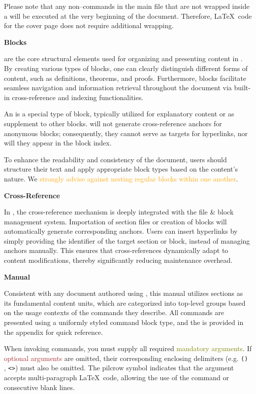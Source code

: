 Please note that any non--\!\SimpleSystemTeX commands in the main file that are not wrapped inside a  will be executed at the very beginning of the document. Therefore, \LaTeX\ code for the cover page does not require additional wrapping.

\medskip\textbf{Blocks}

 are the core structural elements used for organizing and presenting content in \SimpleSystemTeX. By creating various types of blocks, one can clearly distinguish different forms of content, such as definitions, theorems, and proofs. Furthermore, blocks facilitate seamless navigation and information retrieval throughout the document via built-in cross-reference and indexing functionalities.

An  is a special type of block, typically utilized for explanatory content or as supplement to other blocks. \SimpleSystemTeX will not generate cross-reference anchors for anonymous blocks; consequently, they cannot serve as targets for hyperlinks, nor will they appear in the block index.

To enhance the readability and consistency of the document, users should structure their text and apply appropriate block types based on the content's nature. We \textcolor{orange}{strongly advise against nesting regular blocks within one another}.

\medskip\textbf{Cross-Reference}

In \SimpleSystemTeX, the cross-reference mechanism is deeply integrated with the file \& block management system. Importation of section files or creation of blocks will automatically generate corresponding anchors. Users can insert hyperlinks by simply providing the identifier of the target section or block, instead of managing anchors manually. This ensures that cross-references dynamically adapt to content modifications, thereby significantly reducing maintenance overhead.

\medskip\SimpleSystemTeX[bf]\textbf{Manual}

Consistent with any document authored using \SimpleSystemTeX, this manual utilizes sections as its fundamental content units, which are categorized into top-level groups based on the usage contexts of the commands they describe. All commands are presented using a uniformly styled command block type, and the  is provided in the appendix for quick reference.

When invoking \SimpleSystemTeX commands, you must supply all required \textcolor{olive}{mandatory arguments}. If \textcolor{brown}{optional arguments} are omitted, their corresponding enclosing delimiters (e.g. \texttt{()} , \texttt{<>}) must also be omitted. The pilcrow symbol \texttt{\longarg} indicates that the argument accepts multi-paragraph \LaTeX\ code, allowing the use of the  command or consecutive blank lines.

